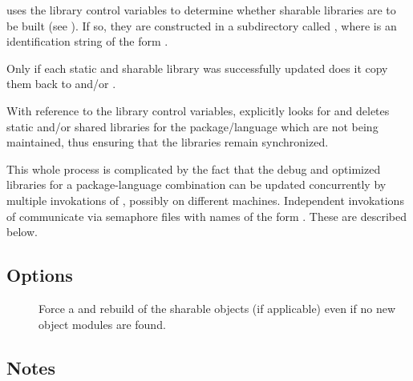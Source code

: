  uses the library control variables to determine whether
sharable libraries are to be built (see ).  If so, they are
constructed in a subdirectory called , where  is
an identification string of the form .

Only if each static and sharable library was successfully updated does it copy
them back to  and/or .

With reference to the library control variables,  explicitly
looks for and deletes static and/or shared libraries for the package/language
which are not being maintained, thus ensuring that the libraries remain
synchronized.

This whole process is complicated by the fact that the debug and optimized
libraries for a package-language combination can be updated concurrently by
multiple invokations of , possibly on different machines.
Independent invokations of  communicate via semaphore files
with names of the form .  These are described below.

\subsection*{Options}

\begin{description}
\item[]
   Force a  and rebuild of the sharable objects (if
   applicable) even if no new object modules are found.
\end{description}

\subsection*{Notes}

